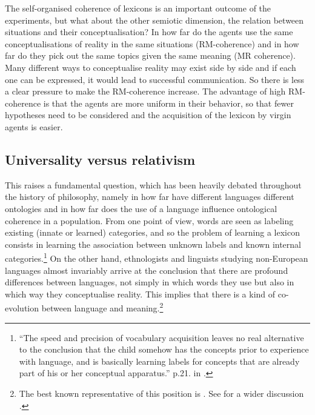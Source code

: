 The self-organised coherence of lexicons is an important
outcome of the experiments, but what about the other
semiotic dimension, the relation
between situations and their conceptualisation? 
In how far do the agents use the same 
conceptualisations of reality in the same situations
(RM-coherence) and in how far do they pick out the same topics
given the same meaning (MR coherence). Many different ways
to conceptualise reality may exist side by side and if
each one can be expressed, it would lead to successful
communication. So there is 
less a clear pressure to make the RM-coherence increase. 
The advantage of high RM-coherence is that the agents 
are more uniform in their behavior, so that fewer 
hypotheses need to be considered and the acquisition of 
the lexicon by virgin agents is easier. 

\subsection{Universality versus relativism}

This raises a fundamental question, which has been
heavily debated throughout the history of 
philosophy, namely in how far have different languages
different ontologies and in how far does the use of a 
language influence ontological coherence in 
a population. From one point of view, words are seen as labeling 
existing (innate or learned) categories, and so the problem
of learning a lexicon consists in learning 
the association between unknown labels and 
known internal categories.\footnote{
``The speed and precision of vocabulary acquisition 
leaves no real alternative to the conclusion that the 
child somehow has the concepts prior to 
experience with language, and is basically learning 
labels for concepts that are already part of his or 
her conceptual apparatus.'' p.21. in \cite{Chomsky:1987}.}
On the other hand, ethnologists and linguists studying 
non-European languages almost invariably arrive at the 
conclusion that there are profound differences between 
languages, not simply in which words they use but also 
in which way they conceptualise reality. This implies
that there is a kind of co-evolution between language
and meaning.\footnote{The best known representative of 
this position is \cite{Whorf:1956}. 
See for a wider discussion \cite{Lee:1996}.}

